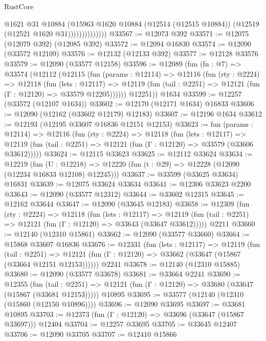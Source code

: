 \begin{lexlean}{RustCore}
\begin{coremodule}
                          @1621
                          @31
                          @10884
                          (@15963
                            @1620
                            @10884
                            (@12514 (@12515 @10884))
                            (@12519 (@12521 @1620 @31))))))))))))))
@33567 := @12073 @392
@33571 := @12075 (@12079 @392) (@12085 @392)
@33572 := @12094 @16830
@33574 := @12090 (@33572 @12109)
@33576 := @12132 (@12133 @392)
@33577 := @12128 @33576
@33579 := @12090 (@33577 @12158)
@33596 := @12089
    (fun (fn : @7) =>
    @33574
      (@12112
        (@12115
          (fun (params : @12114) =>
          @12116
            (fun (rty : @2224) =>
            @12118
              (fun (lets : @12117) =>
              @12119 (fun (tail : @2251) => @12121 (fun (Γ : @12120) => @33579 @12205))))))
        @12251))
    @1634
@33599 := @12257 (@33572 (@12107 @1634))
@33602 := @12170 (@12171 @1634) @16833
@33606 := @12090 (@12162 (@33602 @12179) @12183)
@33607 := @12196 @1634
@33612 := @12193 (@12195 @33607 @16836 @12151 @12153)
@33623 := fun (params : @12114) =>
  @12116
    (fun (rty : @2224) =>
    @12118
      (fun (lets : @12117) =>
      @12119 (fun (tail : @2251) => @12121 (fun (Γ : @12120) => @33579 (@33606 @33612)))))
@33624 := @12115 @33623
@33625 := @12112 @33624
@33634 := @12219
    (fun (U : @12218) => @12220 (fun (t : @29) => @12228 (@12090 (@12234 @16833 @12108) @12245)))
@33637 := @33599 (@33625 @33634) @16831
@33639 := @12075 @33624 @33634
@33641 := @12306 @33623 @2200
@33643 := @12090 (@33577 @12312)
@33644 := @33602 @12315
@33645 := @12162 @33644
@33647 := @12090 (@33645 @12183)
@33658 := @12309
    (fun (rty : @2224) =>
    @12118
      (fun (lets : @12117) =>
      @12119 (fun (tail : @2251) => @12121 (fun (Γ : @12120) => @33643 (@33647 @33612)))))
    @2211
@33660 := @12140 (@12310 @15861)
@33662 := @12090 (@33577 @33660)
@33664 := @15868 @33607 @16836
@33676 := @12331
    (fun (lets : @12117) =>
    @12119
      (fun (tail : @2251) =>
      @12121 (fun (Γ : @12120) => @33662 (@33647 (@15867 (@33664 @12151 @12153))))))
    @2241
@33678 := @12140 (@12310 @15885)
@33680 := @12090 (@33577 @33678)
@33681 := @33664 @2241
@33690 := @12355
    (fun (tail : @2251) => @12121 (fun (Γ : @12120) => @33680 (@33647 (@15867 (@33681 @12153)))))
    @10895
@33695 := @33577 (@12140 (@12310 (@15860 (@12150 @10896))))
@33696 := @12090 @33695
@33697 := @33681 @10895
@33703 := @12373 (fun (Γ : @12120) => @33696 (@33647 (@15867 @33697))) @12404
@33704 := @12257 @33695
@33705 := @33645 @12407
@33706 := @12090 @33705
@33707 := @12410 @15866

\end{coremodule}
\end{lexlean}
